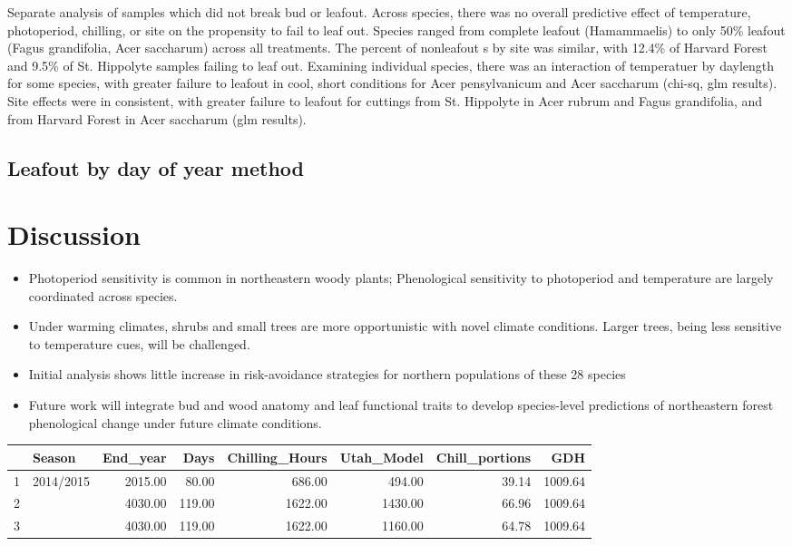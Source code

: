 \documentclass[11pt]{article}
\begin{document}
Separate analysis of samples which did not break bud or leafout. Across species, there was no overall predictive effect of temperature, photoperiod, chilling, or site on the propensity to fail to leaf out. 
Species ranged from complete leafout (Hamammaelis) to only 50\% leafout (Fagus grandifolia, Acer saccharum) across all treatments. The percent of nonleafout s by site was similar, with 12.4\% of Harvard Forest and 9.5\% of St. Hippolyte samples failing to leaf out. Examining individual species,  there was an interaction of temperatuer by daylength for some species, with greater failure to leafout in cool, short conditions for Acer pensylvanicum  and Acer saccharum (chi-sq, glm results). Site effects were in consistent, with greater failure to leafout for cuttings from St. Hippolyte in Acer rubrum and Fagus grandifolia, and from Harvard Forest in Acer saccharum (glm results).
 
\subsection{Leafout by day of year method}


 

\section{Discussion}

\begin{itemize}

\item{Photoperiod sensitivity is common in northeastern woody plants; Phenological sensitivity to photoperiod and temperature are largely coordinated across species.}
\item{Under warming climates, shrubs and small trees are more opportunistic with novel climate conditions. Larger trees, being less sensitive to temperature cues, will be challenged. }
\item{Initial analysis shows little increase in risk-avoidance strategies for northern populations of these 28 species}
\item{Future work will integrate bud and wood anatomy and leaf functional traits to develop species-level predictions of northeastern forest phenological change under future climate conditions.}
\end{itemize}



\begin{table}[ht]
\centering
\begin{tabular}{rlrrrrrr}
  \hline
 & Season & End\_year & Days & Chilling\_Hours & Utah\_Model & Chill\_portions & GDH \\ 
  \hline
1 & 2014/2015 & 2015.00 & 80.00 & 686.00 & 494.00 & 39.14 & 1009.64 \\ 
  2 &  & 4030.00 & 119.00 & 1622.00 & 1430.00 & 66.96 & 1009.64 \\ 
  3 &  & 4030.00 & 119.00 & 1622.00 & 1160.00 & 64.78 & 1009.64 \\ 
   \hline
\end{tabular}
\end{table}
\end{document}
